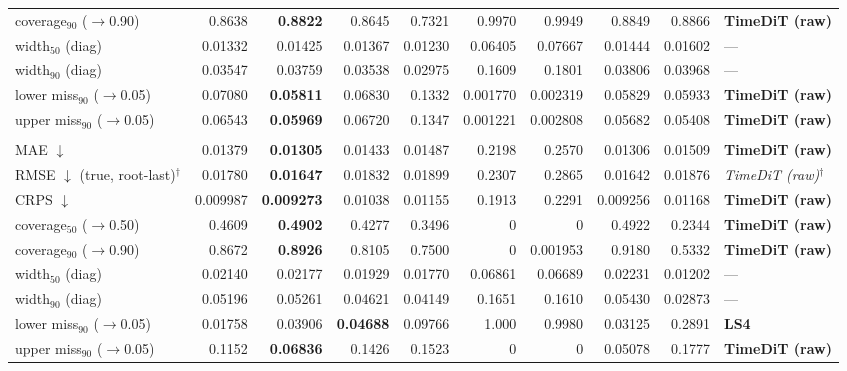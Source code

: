 \documentclass[11pt,a4paper]{article}
\begin{document}
\begin{landscape}
\begin{center}
\begin{tabular}{lrrrrrrrrl}
coverage$_{90}$ ($\to$0.90) & 0.8638 & \textbf{0.8822} & 0.8645 & 0.7321 & 0.9970 & 0.9949 & 0.8849 & 0.8866 & \textbf{TimeDiT (raw)} \\
width$_{50}$ (diag) & 0.01332 & 0.01425 & 0.01367 & 0.01230 & 0.06405 & 0.07667 & 0.01444 & 0.01602 & --- \\
width$_{90}$ (diag) & 0.03547 & 0.03759 & 0.03538 & 0.02975 & 0.1609 & 0.1801 & 0.03806 & 0.03968 & --- \\
lower miss$_{90}$ ($\to$0.05) & 0.07080 & \textbf{0.05811} & 0.06830 & 0.1332 & 0.001770 & 0.002319 & 0.05829 & 0.05933 & \textbf{TimeDiT (raw)} \\
upper miss$_{90}$ ($\to$0.05) & 0.06543 & \textbf{0.05969} & 0.06720 & 0.1347 & 0.001221 & 0.002808 & 0.05682 & 0.05408 & \textbf{TimeDiT (raw)} \\
\addlinespace
\multicolumn{10}{l}{\textbf{rv ($M$ scalar)}} \\
MAE $\downarrow$ & 0.01379 & \textbf{0.01305} & 0.01433 & 0.01487 & 0.2198 & 0.2570 & 0.01306 & 0.01509 & \textbf{TimeDiT (raw)} \\
RMSE $\downarrow$ (true, root-last)$^{\dagger}$ & 0.01780 & \textbf{0.01647} & 0.01832 & 0.01899 & 0.2307 & 0.2865 & 0.01642 & 0.01876 & \textit{TimeDiT (raw)}$^{\dagger}$ \\
CRPS $\downarrow$ & 0.009987 & \textbf{0.009273} & 0.01038 & 0.01155 & 0.1913 & 0.2291 & 0.009256 & 0.01168 & \textbf{TimeDiT (raw)} \\
coverage$_{50}$ ($\to$0.50) & 0.4609 & \textbf{0.4902} & 0.4277 & 0.3496 & 0 & 0 & 0.4922 & 0.2344 & \textbf{TimeDiT (raw)} \\
coverage$_{90}$ ($\to$0.90) & 0.8672 & \textbf{0.8926} & 0.8105 & 0.7500 & 0 & 0.001953 & 0.9180 & 0.5332 & \textbf{TimeDiT (raw)} \\
width$_{50}$ (diag) & 0.02140 & 0.02177 & 0.01929 & 0.01770 & 0.06861 & 0.06689 & 0.02231 & 0.01202 & --- \\
width$_{90}$ (diag) & 0.05196 & 0.05261 & 0.04621 & 0.04149 & 0.1651 & 0.1610 & 0.05430 & 0.02873 & --- \\
lower miss$_{90}$ ($\to$0.05) & 0.01758 & 0.03906 & \textbf{0.04688} & 0.09766 & 1.000 & 0.9980 & 0.03125 & 0.2891 & \textbf{LS4} \\
upper miss$_{90}$ ($\to$0.05) & 0.1152 & \textbf{0.06836} & 0.1426 & 0.1523 & 0 & 0 & 0.05078 & 0.1777 & \textbf{TimeDiT (raw)} \\
\bottomrule
\end{tabular}
\end{center}
\end{landscape}
\end{document}
